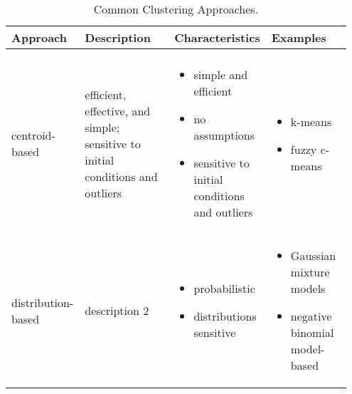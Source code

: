 \begin{sidewaystable}
    \centering
    \caption{Common Clustering Approaches.}
    \label{tab:clusterApproaches} 
    \begin{tabular}{
    >{\raggedright\arraybackslash}p{0.15\linewidth} 
    >{\raggedright\arraybackslash}p{0.30\linewidth} 
    >{\raggedright\arraybackslash}p{0.25\linewidth} 
    >{\raggedright\arraybackslash}p{0.25\linewidth}
    }
        \hline 
        Approach & Description & Characteristics & Examples \\ 
        \hline \\ [-0.5em]
        
        centroid-based \linebreak & 
        efficient, effective, and simple; sensitive to initial conditions and outliers  \linebreak &
        \vspace{-1em}
        \begin{itemize}[nosep,leftmargin=*,label={--}]
            \item[\scriptsize\faPlusCircle] simple and efficient
            \item[\scriptsize\faPlusCircle] no assumptions
            \item[\scriptsize\faMinusCircle] sensitive to initial conditions and outliers
        \end{itemize}\linebreak & 
        \vspace{-1em}
        \begin{itemize}[nosep,leftmargin=*,label={--}]
            \item k-means
            \item fuzzy c-means
        \end{itemize}\linebreak \\ 
        
        distribution-based \linebreak & 
        description 2 \linebreak &
        \vspace{-1em}
        \begin{itemize}[nosep,leftmargin=*,label={--}]
            \item[\scriptsize\faPlusCircle] probabilistic
            \item[\scriptsize\faMinusCircle] distributions sensitive
        \end{itemize}\linebreak & 
        \vspace{-1em}
        \begin{itemize}[nosep,leftmargin=*,label={--}]
            \item Gaussian mixture models
            \item negative binomial model-based
        \end{itemize}\linebreak\\ 
        

\end{tabular}
\end{sidewaystable}
